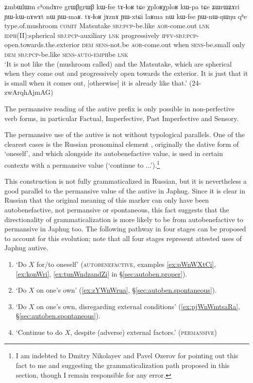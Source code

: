\begin{exe}
 \ex \label{ex:YWnWNWNu}
 \gll ʑmbɯlɯm cʰondɤre grɯβgrɯβ kɯ-fse tɤ-ɬoʁ tɕe χploʁχploʁ kɯ-pa tɕe ʑɯrɯʑɤri ɲɯ-kɯ-nɤwɤt nɯ ɲɯ-maʁ. tɤ-ɬoʁ jɤznɤ ɲɯ-xtɕi laʁma nɯ kɯ-fse ɲɯ-nɯ-ŋɯ\redp{}ŋu qʰe\\
type.of.mushroom \textsc{comit} Matsutake \textsc{sbj}:\textsc{pcp}-be.like \textsc{aor}-come.out \textsc{lnk} \textsc{idph(II):}spherical \textsc{sbj}:\textsc{pcp}-auxiliary \textsc{lnk} progressively \textsc{ipfv}-\textsc{sbj}:\textsc{pcp}-open.towards.the.exterior \textsc{dem} \textsc{sens}-not.be  \textsc{aor}-come.out when \textsc{sens}-be.small only \textsc{dem} \textsc{sbj}:\textsc{pcp}-be.like \textsc{sens}-\textsc{auto}-\textsc{emph}\redp{}be \textsc{lnk}\\
\glt `It is not like the (mushroom called)  and the Matsutake, which are spherical when they come out and progressively open towards the exterior. It is just that it is small when it comes out, [otherwise] it is already like that.'  (24-zwArqhAjmAG)
 \end{exe}
 
The permansive reading of the autive prefix is only possible in non-perfective verb forms, in particular Factual, Imperfective, Past Imperfective and Sensory.

The permansive use of the autive  is not without typological parallels. One of the clearest cases is the Russian pronominal element , originally the dative form of  `oneself', and which alongside its autobenefactive value,  is used in certain contexts with a permansive value (`continue to ...').\footnote{I am indebted to Dmitry Nikolayev and Pavel Ozerov for pointing out this fact to me and suggesting the grammaticalization path proposed in this section, though I remain responsible for any error.}
 
This construction is not fully grammaticalized in Russian, but it is nevertheless a good parallel to the permansive value of the autive in Japhug. Since it is clear in Russian that the original meaning of this marker can only have been autobenefactive, not permansive or spontaneous, this fact suggests that the directionality of grammaticalization is more likely to be from autobenefactive to permansive in Japhug too. The following pathway in four stages can be proposed to account for this evolution; note that all four stages represent attested uses of Japhug autive.

\begin{enumerate}
\item `Do $X$ for/to oneself' (\textsc{autobenefactive}, examples \ref{ex:pWnWXtCi}, \ref{ex:konWri}, \ref{ex:tunWndzandZi} in §\ref{sec:autoben.proper}).  
\item `Do $X$ on one's own' (\ref{ex:zYWnWrua}, §\ref{sec:autoben.spontaneous}).
\item `Do $X$ on one's own, disregarding external conditions' (\ref{ex:pjWnWmtsaRa}, §\ref{sec:autoben.spontaneous}).
\item `Continue to do $X$, despite (adverse) external factors.' (\textsc{permansive})
\end{enumerate}
 
